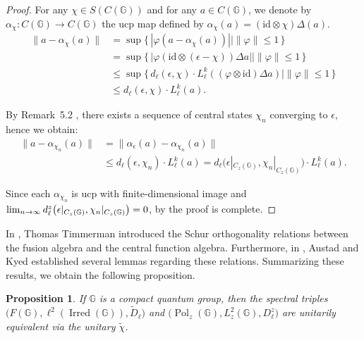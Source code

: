 \documentclass[12pt, reqno]{amsart}
\newtheorem{proposition}[theorem]{Proposition}
\theoremstyle{definition}
\theoremstyle{remark}
\numberwithin{equation}{section}
\begin{document}
\begin{proof}
 For any $\chi\in S(C(\mathbb{G}))$ and for any $a\in C(\mathbb{G})$, we denote 
 by $\alpha_\chi:C(\mathbb{G})\to C(\mathbb{G})$ the ucp map defined by 
 $\alpha_\chi(a)=(\mathrm{id}\otimes \chi)\Delta(a)$.
\begin{align*}
    \|a-\alpha_\chi(a)\|
    &=\sup\{\,|\varphi(a-\alpha_\chi(a))| \mid \|\varphi\|\leq 1\,\}  \\
    &=\sup\{\,|\varphi(\mathrm{id}\otimes(\epsilon-\chi))\Delta a| 
        \mid \|\varphi\|\leq 1\,\}\\
    &\leq \sup\{\,d_\ell(\epsilon,\chi) \cdot L_\ell^k((\varphi\otimes\mathrm{id})\Delta a) 
        \mid \|\varphi\|\leq 1\,\}\\
    &\leq d_\ell(\epsilon,\chi)\cdot L_\ell^k(a).
\end{align*}

 By Remark~5.2 , there exists a sequence of central states 
 $\chi_n$ converging to $\epsilon$, hence we obtain:
\begin{align*}
    \|a-\alpha_{\chi_n}(a)\|
    &=\|\alpha_\epsilon(a)-\alpha_{\chi_n}(a)\| \\
    &\leq d_\ell(\epsilon,\chi_n)\cdot L_\ell^k(a)
     = d_\ell\bigl(\epsilon|_{C_z(\mathbb{G})},\chi_n|_{C_z(\mathbb{G})}\bigr)
       \cdot L_\ell^k(a).
\end{align*}

 Since each $\alpha_{\chi_n}$ is ucp with finite-dimensional image and 
 $\lim_{n\to\infty} d_\ell^z\bigl(\epsilon|_{C_z(\mathbb{G})},\chi_n|_{C_z(\mathbb{G})}\bigr)\\=0$, 
 by \cite[Theorem~3.1]{27} the proof is complete.
\end{proof}


In \cite{26}, Thomas Timmerman introduced the Schur orthogonality relations 
between the fusion algebra and the central function algebra. Furthermore, in 
\cite{16}, Austad and Kyed established several lemmas regarding these relations. 
Summarizing these results, we obtain the following proposition.

\begin{proposition}\label{prop unitary}
If $\mathbb{G}$ is a compact quantum group, then the spectral triples 
$\bigl(F(\mathbb{G}), \ell^2(\operatorname{Irred}(\mathbb{G})), \tilde{D}_\ell\bigr)$ 
and 
$\bigl(\operatorname{Pol}_z(\mathbb{G}), L^2_z(\mathbb{G}), D_\ell^z\bigr)$ 
are unitarily equivalent via the unitary $\tilde{\chi}$.
\end{proposition}
\end{document}
